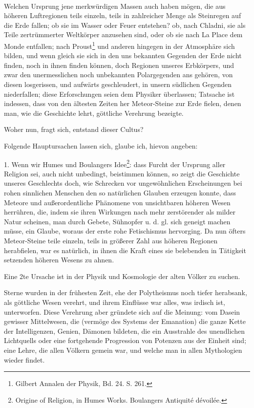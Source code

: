 \documentclass[a4paper, 11pt, oneside, polutonikogreek, german]{article}
\begin{document}
\paragraph{}
Welchen Ursprung jene merkwürdigen Massen auch haben mögen, die aus höheren Luftregionen teils einzeln, teils in zahlreicher Menge als Steinregen auf die Erde fallen; ob sie im Wasser oder Feuer entstehen? ob, nach Chladni, sie als Teile zertrümmerter Weltkörper anzusehen sind, oder ob sie nach La Place dem Monde entfallen; nach Proust\footnote{Gilbert Annalen der Physik, Bd. 24. S. 261.} und anderen hingegen in der Atmosphäre sich bilden, und wenn gleich sie sich in den uns bekannten Gegenden der Erde nicht finden, noch in ihnen finden können, doch Regionen unseres Erbkörpers, und zwar den unermesslichen noch unbekannten Polargegenden ans gehören, von diesen losgerissen, und aufwärts geschleudert, in unsern südlichen Gegenden niederfallen; diese Erforschungen seien dem Physiker überlassen; Tatsache ist indessen, dass von den ältesten Zeiten her Meteor-Steine zur Erde fielen, denen man, wie die Geschichte lehrt, göttliche Verehrung bezeigte.

Woher nun, fragt sich, entstand dieser Cultus?

Folgende Hauptursachen lassen sich, glaube ich, hievon angeben:

1. Wenn wir Humes und Boulangers Idee\footnote{Origine of Religion, in Humes Works. Boulangers Antiquité dévoilée.}: dass Furcht der Ursprung aller Religion sei, auch nicht unbedingt, beistimmen können, so zeigt die Geschichte unseres Geschlechts doch, wie Schrecken vor ungewöhnlichen Erscheinungen bei rohen sinnlichen Menschen den so natürlichen Glauben erzeugen konnte, dass Meteore und außerordentliche Phänomene von unsichtbaren höheren Wesen herrühren, die, indem sie ihren Wirkungen nach mehr zerstörender als milder Natur scheinen, man durch Gebete, Sühnopfer u. d. gl. sich geneigt machen müsse, ein Glaube, woraus der erste rohe Fetischismus hervorging. Da nun öfters Meteor-Steine teile einzeln, teils in größerer Zahl aus höheren Regionen herabfielen, war es natürlich, in ihnen die Kraft eines sie belebenden in Tätigkeit setzenden höheren Wesens zu ahnen.

Eine 2te Ursache ist in der Physik und Kosmologie der alten Völker zu suchen.

Sterne wurden in der frühesten Zeit, ehe der Polytheismus noch tiefer herabsank, als göttliche Wesen verehrt, und ihrem Einflüsse war alles, was irdisch ist, unterworfen. Diese Verehrung aber gründete sich auf die Meinung: vom Dasein gewisser Mittelwesen, die (vermöge des Systems der Emanation) die ganze Kette der Intelligenzen, Genien, Dämonen bildeten, die ein Ausstrahle des unendlichen Lichtquells oder eine fortgehende Progression von Potenzen aus der Einheit sind; eine Lehre, die allen Völkern gemein war, und welche man in allen Mythologien wieder findet.
\end{document}
